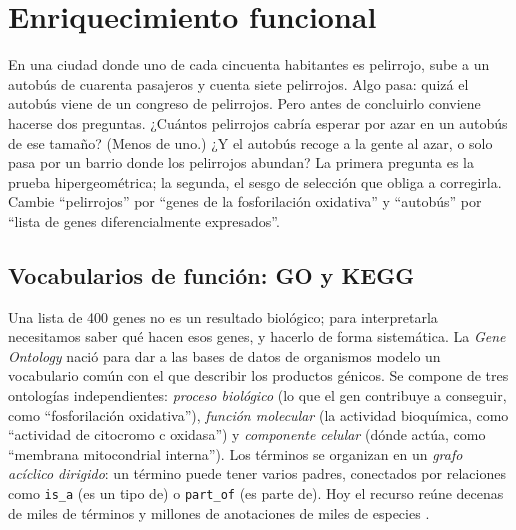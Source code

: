 \section{Enriquecimiento funcional}\label{sec:11-enriq}

\begin{intuicion}
En una ciudad donde uno de cada cincuenta habitantes es pelirrojo, sube a un autobús de cuarenta pasajeros y cuenta siete pelirrojos. Algo pasa: quizá el autobús viene de un congreso de pelirrojos. Pero antes de concluirlo conviene hacerse dos preguntas. ¿Cuántos pelirrojos cabría esperar por azar en un autobús de ese tamaño? (Menos de uno.) ¿Y el autobús recoge a la gente al azar, o solo pasa por un barrio donde los pelirrojos abundan? La primera pregunta es la prueba hipergeométrica; la segunda, el sesgo de selección que obliga a corregirla. Cambie ``pelirrojos'' por ``genes de la fosforilación oxidativa'' y ``autobús'' por ``lista de genes diferencialmente expresados''.
\end{intuicion}

\subsection{Vocabularios de función: GO y KEGG}

Una lista de 400 genes no es un resultado biológico; para interpretarla necesitamos saber qué hacen esos genes, y hacerlo de forma sistemática. La \emph{Gene Ontology} \parencite{c11-ashburner2000} nació para dar a las bases de datos de organismos modelo un vocabulario común con el que describir los productos génicos. Se compone de tres ontologías independientes: \emph{proceso biológico} (lo que el gen contribuye a conseguir, como ``fosforilación oxidativa''), \emph{función molecular} (la actividad bioquímica, como ``actividad de citocromo c oxidasa'') y \emph{componente celular} (dónde actúa, como ``membrana mitocondrial interna''). Los términos se organizan en un \emph{grafo acíclico dirigido}: un término puede tener varios padres, conectados por relaciones como \texttt{is\_a} (es un tipo de) o \texttt{part\_of} (es parte de). Hoy el recurso reúne decenas de miles de términos y millones de anotaciones de miles de especies \parencite{c11-go2023}.

